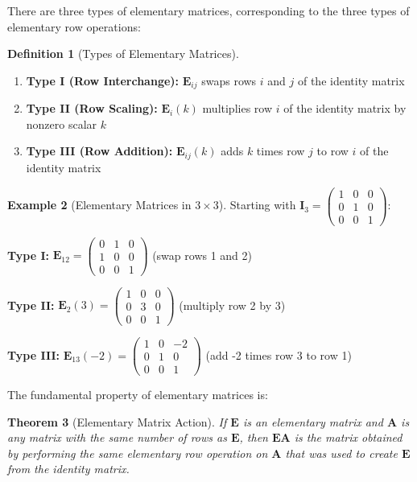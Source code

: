 \documentclass[12pt]{article}
\numberwithin{equation}{section}
\newcommand{\mat}[1]{\mathbf{#1}}        %
\theoremstyle{plain}
\newtheorem{theorem}{Theorem}[section]
\theoremstyle{definition}
\newtheorem{definition}[theorem]{Definition}
\newtheorem{example}[theorem]{Example}
\theoremstyle{remark}
\begin{document}
There are three types of elementary matrices, corresponding to the three types of elementary row operations:

\begin{definition}[Types of Elementary Matrices]
\begin{enumerate}
\item \textbf{Type I (Row Interchange):} $\mat{E}_{ij}$ swaps rows $i$ and $j$ of the identity matrix
\item \textbf{Type II (Row Scaling):} $\mat{E}_i(k)$ multiplies row $i$ of the identity matrix by nonzero scalar $k$
\item \textbf{Type III (Row Addition):} $\mat{E}_{ij}(k)$ adds $k$ times row $j$ to row $i$ of the identity matrix
\end{enumerate}
\end{definition}

\begin{example}[Elementary Matrices in $3 \times 3$]
Starting with $\mat{I}_3 = \begin{pmatrix} 1 & 0 & 0 \\ 0 & 1 & 0 \\ 0 & 0 & 1 \end{pmatrix}$:

\textbf{Type I:} $\mat{E}_{12} = \begin{pmatrix} 0 & 1 & 0 \\ 1 & 0 & 0 \\ 0 & 0 & 1 \end{pmatrix}$ (swap rows 1 and 2)

\textbf{Type II:} $\mat{E}_2(3) = \begin{pmatrix} 1 & 0 & 0 \\ 0 & 3 & 0 \\ 0 & 0 & 1 \end{pmatrix}$ (multiply row 2 by 3)

\textbf{Type III:} $\mat{E}_{13}(-2) = \begin{pmatrix} 1 & 0 & -2 \\ 0 & 1 & 0 \\ 0 & 0 & 1 \end{pmatrix}$ (add -2 times row 3 to row 1)
\end{example}

The fundamental property of elementary matrices is:

\begin{theorem}[Elementary Matrix Action]
If $\mat{E}$ is an elementary matrix and $\mat{A}$ is any matrix with the same number of rows as $\mat{E}$, then $\mat{E}\mat{A}$ is the matrix obtained by performing the same elementary row operation on $\mat{A}$ that was used to create $\mat{E}$ from the identity matrix.
\end{theorem}
\end{document}
